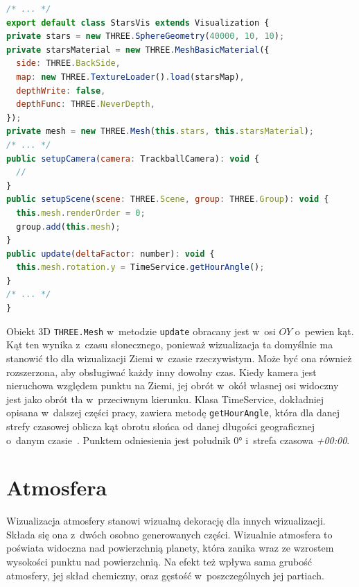 \begin{lstlisting}[float, language=javascript, label={lst:starsVis}, caption={
  Fragmenty klasy \texttt{StarsVis}}
]
/* ... */
export default class StarsVis extends Visualization {
private stars = new THREE.SphereGeometry(40000, 10, 10);
private starsMaterial = new THREE.MeshBasicMaterial({
  side: THREE.BackSide,
  map: new THREE.TextureLoader().load(starsMap),
  depthWrite: false,
  depthFunc: THREE.NeverDepth,
});
private mesh = new THREE.Mesh(this.stars, this.starsMaterial);
/* ... */
public setupCamera(camera: TrackballCamera): void {
  //
}
public setupScene(scene: THREE.Scene, group: THREE.Group): void {
  this.mesh.renderOrder = 0;
  group.add(this.mesh);
}
public update(deltaFactor: number): void {
  this.mesh.rotation.y = TimeService.getHourAngle();
}
/* ... */
}
\end{lstlisting}

Obiekt 3D \texttt{THREE.Mesh} w~metodzie \texttt{update} obracany jest w~osi $OY$ o~pewien kąt. Kąt ten wynika z~czasu słonecznego, ponieważ wizualizacja ta domyślnie ma stanowić tło dla wizualizacji Ziemi w~czasie rzeczywistym. Może być ona również rozszerzona, aby obsługiwać każdy inny dowolny czas. Kiedy kamera jest nieruchowa względem punktu na Ziemi, jej obrót w~okół własnej osi widoczny jest jako obrót tła w~przeciwnym kierunku. Klasa TimeService, dokładniej opisana w~dalszej części pracy, zawiera metodę \texttt{getHourAngle}, która dla danej strefy czasowej oblicza kąt obrotu słońca od danej długości geograficznej o~danym czasie~\cite{SolarTime}. Punktem odniesienia jest południk $\ang{0}$ i~strefa czasowa \textit{+00:00}. 

\section{Atmosfera}

Wizualizacja atmosfery stanowi wizualną dekorację dla innych wizualizacji. Składa się ona z~dwóch osobno generowanych części. Wizualnie atmosfera to poświata widoczna nad powierzchnią planety, która zanika wraz ze wzrostem wysokości punktu nad powierzchnią. Na efekt też wpływa sama grubość atmosfery, jej skład chemiczny, oraz gęstość w~poszczególnych jej partiach.


